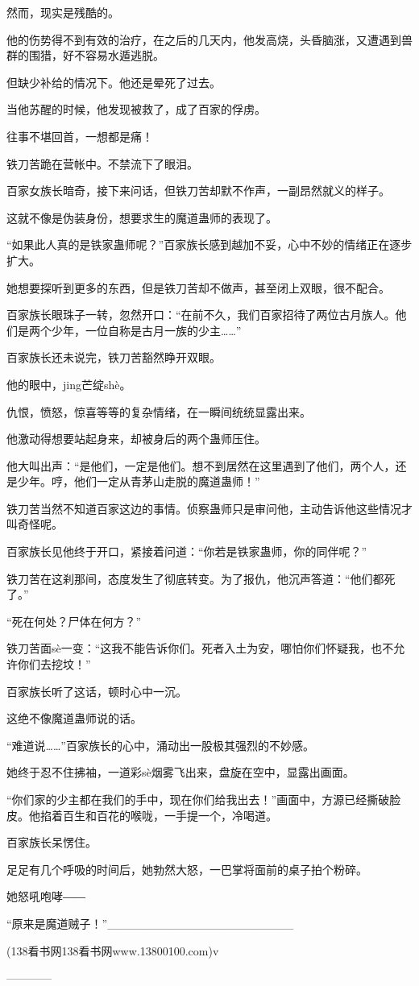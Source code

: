 \begin{this_body}
然而，现实是残酷的。

他的伤势得不到有效的治疗，在之后的几天内，他发高烧，头昏脑涨，又遭遇到兽群的围猎，好不容易水遁逃脱。

但缺少补给的情况下。他还是晕死了过去。

当他苏醒的时候，他发现被救了，成了百家的俘虏。

往事不堪回首，一想都是痛！

铁刀苦跪在营帐中。不禁流下了眼泪。

百家女族长暗奇，接下来问话，但铁刀苦却默不作声，一副昂然就义的样子。

这就不像是伪装身份，想要求生的魔道蛊师的表现了。

“如果此人真的是铁家蛊师呢？”百家族长感到越加不妥，心中不妙的情绪正在逐步扩大。

她想要探听到更多的东西，但是铁刀苦却不做声，甚至闭上双眼，很不配合。

百家族长眼珠子一转，忽然开口：“在前不久，我们百家招待了两位古月族人。他们是两个少年，一位自称是古月一族的少主……”

百家族长还未说完，铁刀苦豁然睁开双眼。

他的眼中，jing芒绽shè。

仇恨，愤怒，惊喜等等的复杂情绪，在一瞬间统统显露出来。

他激动得想要站起身来，却被身后的两个蛊师压住。

他大叫出声：“是他们，一定是他们。想不到居然在这里遇到了他们，两个人，还是少年。哼，他们一定从青茅山走脱的魔道蛊师！”

铁刀苦当然不知道百家这边的事情。侦察蛊师只是审问他，主动告诉他这些情况才叫奇怪呢。

百家族长见他终于开口，紧接着问道：“你若是铁家蛊师，你的同伴呢？”

铁刀苦在这刹那间，态度发生了彻底转变。为了报仇，他沉声答道：“他们都死了。”

“死在何处？尸体在何方？”

铁刀苦面sè一变：“这我不能告诉你们。死者入土为安，哪怕你们怀疑我，也不允许你们去挖坟！”

百家族长听了这话，顿时心中一沉。

这绝不像魔道蛊师说的话。

“难道说……”百家族长的心中，涌动出一股极其强烈的不妙感。

她终于忍不住拂袖，一道彩sè烟雾飞出来，盘旋在空中，显露出画面。

“你们家的少主都在我们的手中，现在你们给我出去！”画面中，方源已经撕破脸皮。他掐着百生和百花的喉咙，一手提一个，冷喝道。

百家族长呆愣住。

足足有几个呼吸的时间后，她勃然大怒，一巴掌将面前的桌子拍个粉碎。

她怒吼咆哮――

“原来是魔道贼子！”\_\_\_\_\_\_\_\_\_\_\_\_\_\_\_\_\_\_\_\_\_\_

(138看书网138看书网www.13800100.com)v

------------

\end{this_body}

